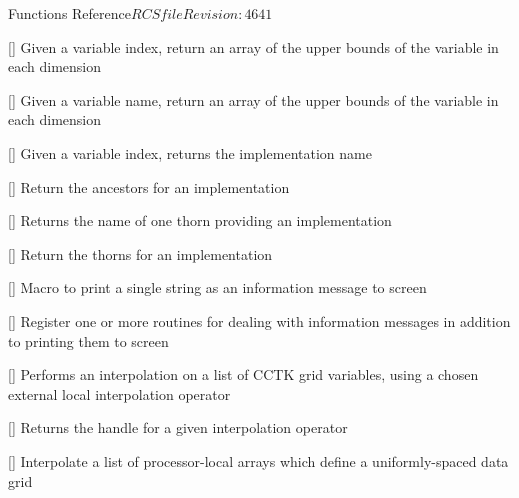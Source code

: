 \begin{cactuspart}{ Functions Reference}{$RCSfile$}{$Revision: 4641 $}
\begin{Lentry}
\item[\code{CCTK\_GroupubndVI}] [\pageref{CCTK-GroupubndVI}]
  Given a variable index, return an array of the upper bounds
  of the variable in each dimension

\item[\code{CCTK\_GroupubndVN}] [\pageref{CCTK-GroupubndVN}]
  Given a variable name, return an array of the upper bounds
  of the variable in each dimension

\item[\code{CCTK\_ImpFromVarI}] [\pageref{CCTK-ImpFromVarI}]
  Given a variable index, returns the implementation name

\item[\code{CCTK\_ImplementationRequires}]
  [\pageref{CCTK-ImplementationRequires}]
  Return the ancestors for an implementation

\item[\code{CCTK\_ImplementationThorn}]
  [\pageref{CCTK-ImplementationThorn}]
  Returns the name of one thorn providing an implementation

\item[\code{CCTK\_ImpThornList}] [\pageref{CCTK-ImpThornList}]
  Return the thorns for an implementation

\item[\code{CCTK\_INFO}] [\pageref{CCTK-INFO}]
  Macro to print a single string as an information message to screen

\item[\code{CCTK\_InfoCallbackRegister}] [\pageref{CCTK-INFOCallbackRegister}]
  Register one or more routines for dealing with information messages
  in addition to printing them to screen

\item[\code{CCTK\_InterpGridArrays}] [\pageref{CCTK-InterpGridArrays}]
  Performs an interpolation on a list of CCTK grid variables,
  using a chosen external local interpolation operator

\item[\code{CCTK\_InterpHandle}] [\pageref{CCTK-InterpHandle}]
  Returns the handle for a given interpolation operator


\item[\code{CCTK\_InterpLocalUniform}] [\pageref{CCTK-InterpLocalUniform}]
  Interpolate a list of processor-local arrays
  which define a uniformly-spaced data grid


\end{Lentry}
\end{cactuspart}
